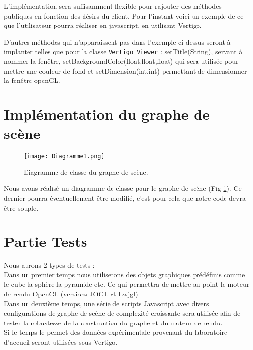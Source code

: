 \documentclass[11pt]{report}
\begin{document}
L'implémentation sera suffisamment flexible pour rajouter des méthodes publiques en fonction des désirs du client. 
Pour l'instant voici un exemple de ce que l'utilisateur pourra réaliser en javascript, en utilisant Vertigo. 

 


D'autres méthodes qui n'apparaissent pas dans l'exemple ci-dessus seront à implanter telles que pour la classe \texttt{Vertigo\_Viewer} : setTitle(String), servant à nommer la fenêtre, setBackgroundColor(float,float,float) qui sera utilisée pour mettre une couleur de fond et setDimension(int,int) permettant de dimensionner la fenêtre openGL.



\section{Implémentation du graphe de scène}

\begin{figure}[h!]
  \caption{Diagramme de classe du graphe de scène.}
  \label{diagrammeClasse}
  \centering
    \texttt{[image: Diagramme1.png]}
\end{figure}

Nous avons réalisé un diagramme de classe pour le graphe de scène (Fig \ref{diagrammeClasse}). Ce dernier pourra éventuellement être modifié, c'est pour cela que notre code devra être souple.


\section{Partie Tests}
Nous aurons 2 types de tests :\\
 
Dans un premier temps nous utiliserons des objets graphiques prédéfinis comme le cube la sphère la pyramide etc. Ce qui permettra de mettre au point le moteur de rendu OpenGL (versions JOGL et Lwjgl). \\

Dans un deuxième temps, une série de scripts Javascript avec divers configurations de graphe de scène de complexité croissante sera utilisée afin de tester la robustesse de la construction du graphe et du moteur de rendu. \\

Si le temps le permet des données expérimentale provenant du laboratoire d'accueil seront utilisées sous Vertigo.
\end{document}
